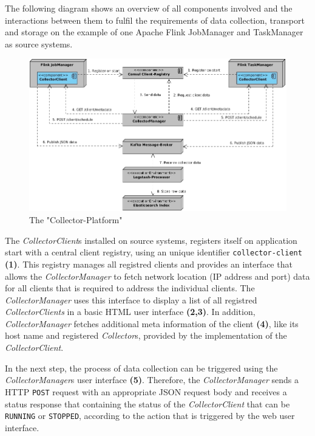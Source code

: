The following diagram shows an overview of all components involved and the interactions between them to fulfil the
requirements of data collection, transport and storage on the example of one Apache Flink JobManager and TaskManager as
source systems.

\begin{figure}[H]
	\centering
	\includegraphics[width=1.0\textwidth]{../uml/component-diagram.jpg}
	\caption{The "Collector-Platform"}
	\label{fig:collector-platform}
\end{figure}

The \textit{CollectorClient}s installed on source systems, registers itself on application start with a central client registry, using
an unique identifier \verb|collector-client| \textbf{(1)}. This registry manages all registred clients and provides an interface
that allows the \textit{CollectorManager} to fetch network location (IP address and port) data for all clients that is required
to address the individual clients. The \textit{CollectorManager} uses this interface to display a list of all registred
\textit{CollectorClients} in a basic HTML user interface \textbf{(2,3)}. In addition, \textit{CollectorManager} fetches additional
meta information of the client \textbf{(4)}, like its host name and registered \textit{Collector}s, provided by the implementation
of the \textit{CollectorClient}.

In the next step, the process of data collection can be triggered using the \textit{CollectorManager}s user interface \textbf{(5)}.
Therefore, the \textit{CollectorManager} sends a HTTP \verb|POST| request with an appropriate JSON request body and receives a
status response that containing the status of the \textit{CollectorClient} that can be \verb|RUNNING| or \verb|STOPPED|,
according to the action that is triggered by the web user interface.

